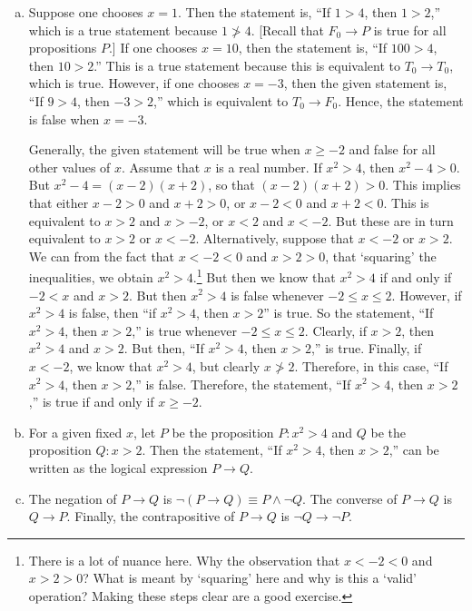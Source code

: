 \documentclass[11pt,letterpaper]{article}
\begin{document}
\sol 
\begin{enumerate}[(a)]
\item Suppose one chooses $x= 1$. Then the statement is, ``If $1 > 4$, then $1 > 2$,'' which is a true statement because $1 \not> 4$. [Recall that $F_0 \to P$ is true for all propositions $P$.] If one chooses $x= 10$, then the statement is, ``If $100 > 4$, then $10 > 2$.'' This is a true statement because this is equivalent to $T_0 \to T_0$, which is true. However, if one chooses $x= -3$, then the given statement is, ``If $9 > 4$, then $-3 > 2$,'' which is equivalent to $T_0 \to F_0$. Hence, the statement is false when $x= -3$. \pspace

Generally, the given statement will be true when $x \geq -2$ and false for all other values of $x$. Assume that $x$ is a real number. If $x^2 > 4$, then $x^2 - 4 > 0$. But $x^2 - 4= (x - 2)(x + 2)$, so that $(x - 2)(x + 2) > 0$. This implies that either $x - 2 > 0$ and $x + 2 > 0$, or $x - 2 < 0$ and $x + 2 < 0$. This is equivalent to $x > 2$ and $x > -2$, or $x < 2$ and $x < -2$. But these are in turn equivalent to $x > 2$ or $x < -2$. Alternatively, suppose that $x < -2$ or $x > 2$. We can from the fact that $x < -2 < 0$ and $x > 2 > 0$, that `squaring' the inequalities, we obtain $x^2 > 4$.\footnote{There is a lot of nuance here. Why the observation that $x < -2 < 0$ and $x > 2 > 0$? What is meant by `squaring' here and why is this a `valid' operation? Making these steps clear are a good exercise.} But then we know that $x^2 > 4$ if and only if $-2 < x$ and $x > 2$. But then $x^2 > 4$ is false whenever $-2 \leq x \leq 2$. However, if $x^2 > 4$ is false, then ``if $x^2 > 4$, then $x > 2$'' is true. So the statement, ``If $x^2 > 4$, then $x > 2$,'' is true whenever $-2 \leq x \leq 2$. Clearly, if $x > 2$, then $x^2 > 4$ and $x > 2$. But then, ``If $x^2 > 4$, then $x > 2$,'' is true. Finally, if $x < -2$, we know that $x^2 > 4$, but clearly $x \not> 2$. Therefore, in this case, ``If $x^2 > 4$, then $x > 2$,'' is false. Therefore, the statement, ``If $x^2 > 4$, then $x > 2$,'' is true if and only if $x \geq -2$. 

\item For a given fixed $x$, let $P$ be the proposition $P: x^2 > 4$ and $Q$ be the proposition $Q: x > 2$. Then the statement, ``If $x^2 > 4$, then $x > 2$,'' can be written as the logical expression $P \to Q$. \pspace

\item The negation of $P \to Q$ is $\neg (P \to Q) \equiv P \wedge \neg Q$. The converse of $P \to Q$ is $Q \to P$. Finally, the contrapositive of $P \to Q$ is $\neg Q \to \neg P$. \pspace


\end{enumerate}
\end{document}
